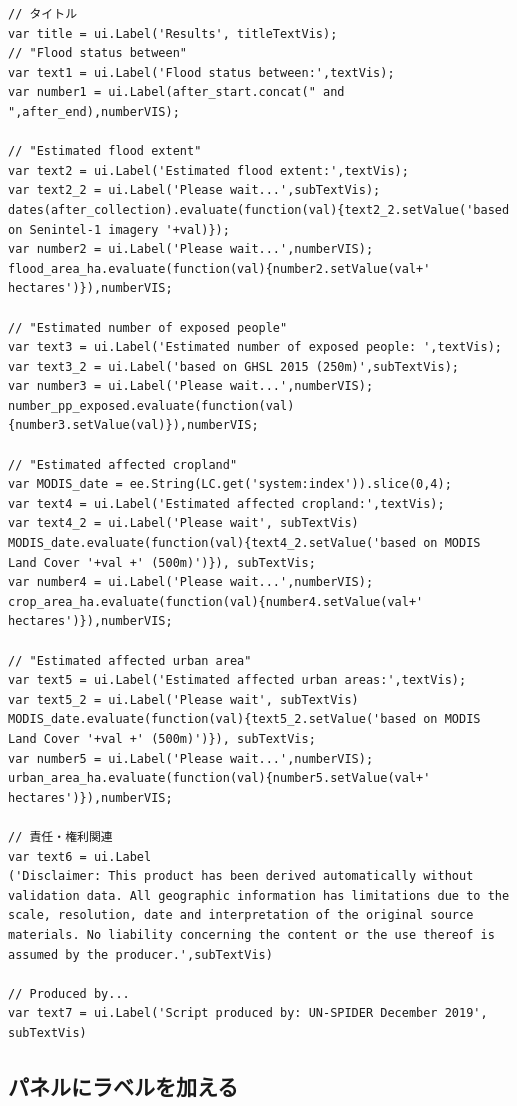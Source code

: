 \documentclass[
]{book}
\begin{document}
\begin{verbatim}
// タイトル
var title = ui.Label('Results', titleTextVis);
// "Flood status between"
var text1 = ui.Label('Flood status between:',textVis);
var number1 = ui.Label(after_start.concat(" and ",after_end),numberVIS);

// "Estimated flood extent"
var text2 = ui.Label('Estimated flood extent:',textVis);
var text2_2 = ui.Label('Please wait...',subTextVis);
dates(after_collection).evaluate(function(val){text2_2.setValue('based on Senintel-1 imagery '+val)});
var number2 = ui.Label('Please wait...',numberVIS); 
flood_area_ha.evaluate(function(val){number2.setValue(val+' hectares')}),numberVIS;

// "Estimated number of exposed people"
var text3 = ui.Label('Estimated number of exposed people: ',textVis);
var text3_2 = ui.Label('based on GHSL 2015 (250m)',subTextVis);
var number3 = ui.Label('Please wait...',numberVIS);
number_pp_exposed.evaluate(function(val){number3.setValue(val)}),numberVIS;

// "Estimated affected cropland"
var MODIS_date = ee.String(LC.get('system:index')).slice(0,4);
var text4 = ui.Label('Estimated affected cropland:',textVis);
var text4_2 = ui.Label('Please wait', subTextVis)
MODIS_date.evaluate(function(val){text4_2.setValue('based on MODIS Land Cover '+val +' (500m)')}), subTextVis;
var number4 = ui.Label('Please wait...',numberVIS);
crop_area_ha.evaluate(function(val){number4.setValue(val+' hectares')}),numberVIS;

// "Estimated affected urban area"
var text5 = ui.Label('Estimated affected urban areas:',textVis);
var text5_2 = ui.Label('Please wait', subTextVis)
MODIS_date.evaluate(function(val){text5_2.setValue('based on MODIS Land Cover '+val +' (500m)')}), subTextVis;
var number5 = ui.Label('Please wait...',numberVIS);
urban_area_ha.evaluate(function(val){number5.setValue(val+' hectares')}),numberVIS;

// 責任・権利関連
var text6 = ui.Label
('Disclaimer: This product has been derived automatically without validation data. All geographic information has limitations due to the scale, resolution, date and interpretation of the original source materials. No liability concerning the content or the use thereof is assumed by the producer.',subTextVis)

// Produced by...
var text7 = ui.Label('Script produced by: UN-SPIDER December 2019', subTextVis)
\end{verbatim}

\hypertarget{ux30d1ux30cdux30ebux306bux30e9ux30d9ux30ebux3092ux52a0ux3048ux308b}{%
\subsection{パネルにラベルを加える}\label{ux30d1ux30cdux30ebux306bux30e9ux30d9ux30ebux3092ux52a0ux3048ux308b}}
\end{document}
